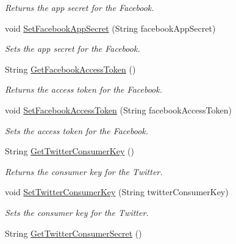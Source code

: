 \begin{DoxyCompactItemize}
\begin{DoxyCompactList}\small\item\em Returns the app secret for the Facebook. \end{DoxyCompactList}\item 
void \hyperlink{classcom_1_1shephertz_1_1app42_1_1paas_1_1sdk_1_1csharp_1_1social_1_1_social_a1cf12f55e132bcfbef55a5b15b43e2d7}{Set\+Facebook\+App\+Secret} (String facebook\+App\+Secret)
\begin{DoxyCompactList}\small\item\em Sets the app secret for the Facebook. \end{DoxyCompactList}\item 
String \hyperlink{classcom_1_1shephertz_1_1app42_1_1paas_1_1sdk_1_1csharp_1_1social_1_1_social_af1b89276ea08efbaa9c8f6995f0d00f8}{Get\+Facebook\+Access\+Token} ()
\begin{DoxyCompactList}\small\item\em Returns the access token for the Facebook. \end{DoxyCompactList}\item 
void \hyperlink{classcom_1_1shephertz_1_1app42_1_1paas_1_1sdk_1_1csharp_1_1social_1_1_social_a1ac8f8c95219bc1fef2eb2aa77359d94}{Set\+Facebook\+Access\+Token} (String facebook\+Access\+Token)
\begin{DoxyCompactList}\small\item\em Sets the access token for the Facebook. \end{DoxyCompactList}\item 
String \hyperlink{classcom_1_1shephertz_1_1app42_1_1paas_1_1sdk_1_1csharp_1_1social_1_1_social_a7d05554dba051412c09b6bf3f422bfad}{Get\+Twitter\+Consumer\+Key} ()
\begin{DoxyCompactList}\small\item\em Returns the consumer key for the Twitter. \end{DoxyCompactList}\item 
void \hyperlink{classcom_1_1shephertz_1_1app42_1_1paas_1_1sdk_1_1csharp_1_1social_1_1_social_aaf84a556852e9cb562e2c24a6585a42a}{Set\+Twitter\+Consumer\+Key} (String twitter\+Consumer\+Key)
\begin{DoxyCompactList}\small\item\em Sets the consumer key for the Twitter. \end{DoxyCompactList}\item 
String \hyperlink{classcom_1_1shephertz_1_1app42_1_1paas_1_1sdk_1_1csharp_1_1social_1_1_social_adba22ec73accaec0c8c521ef591854fc}{Get\+Twitter\+Consumer\+Secret} ()

\end{DoxyCompactItemize}

